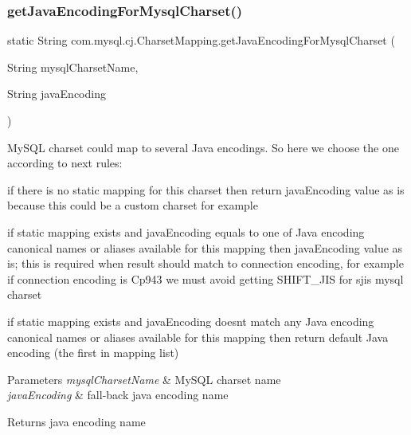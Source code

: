 \subsubsection{\texorpdfstring{get\+Java\+Encoding\+For\+Mysql\+Charset()}{getJavaEncodingForMysqlCharset()}\hspace{0.1cm}{\footnotesize\ttfamily [1/2]}}
{\footnotesize\ttfamily static String com.\+mysql.\+cj.\+Charset\+Mapping.\+get\+Java\+Encoding\+For\+Mysql\+Charset (\begin{DoxyParamCaption}\item[{String}]{mysql\+Charset\+Name,  }\item[{String}]{java\+Encoding }\end{DoxyParamCaption})\hspace{0.3cm}{\ttfamily [static]}}

My\+S\+QL charset could map to several Java encodings. So here we choose the one according to next rules\+: 
\begin{DoxyItemize}
\item if there is no static mapping for this charset then return java\+Encoding value as is because this could be a custom charset for example 
\item if static mapping exists and java\+Encoding equals to one of Java encoding canonical names or aliases available for this mapping then java\+Encoding value as is; this is required when result should match to connection encoding, for example if connection encoding is Cp943 we must avoid getting S\+H\+I\+F\+T\+\_\+\+J\+IS for sjis mysql charset 
\item if static mapping exists and java\+Encoding doesn\textquotesingle{}t match any Java encoding canonical names or aliases available for this mapping then return default Java encoding (the first in mapping list) 
\end{DoxyItemize}


\begin{DoxyParams}{Parameters}
{\em mysql\+Charset\+Name} & My\+S\+QL charset name \\
\hline
{\em java\+Encoding} & fall-\/back java encoding name \\
\hline
\end{DoxyParams}
\begin{DoxyReturn}{Returns}
java encoding name 
\end{DoxyReturn}
\mbox{\label{classcom_1_1mysql_1_1cj_1_1_charset_mapping_a9c7e097901eb66aa023c4c0cf7638fca}} 
